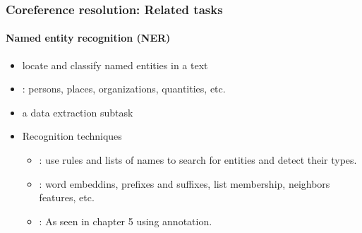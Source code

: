 \documentclass[xcolor=table]{beamer}
\begin{document}
\begin{frame}
	\frametitle{Coreference resolution: Related tasks}
	\framesubtitle{Named entity recognition (NER)}
	
	\begin{itemize}
		\item locate and classify named entities in a text
		\item {}: persons, places, organizations, quantities, etc.
		\item a data extraction subtask
		\item Recognition techniques
		\begin{itemize}
			\item {}: use rules and lists of names to search for entities and detect their types.
			\item {}: word embeddins, prefixes and suffixes, list membership, neighbors features, etc.
			\item {}: As seen in chapter 5 using  annotation.
		\end{itemize}
	\end{itemize}
	
\end{frame}


\end{document}
